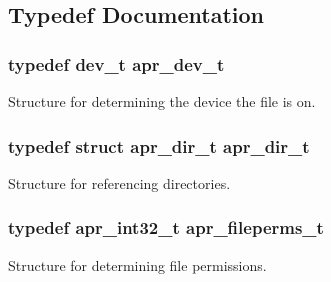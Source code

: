 \subsection{Typedef Documentation}
\hypertarget{group__apr__file__info_gae2c25c4b679613081599f776efa96c4a}{
\subsubsection[{apr\-\_\-dev\-\_\-t}]{\setlength{\rightskip}{0pt plus 5cm}typedef dev\-\_\-t {\bf apr\-\_\-dev\-\_\-t}}}\label{group__apr__file__info_gae2c25c4b679613081599f776efa96c4a}
Structure for determining the device the file is on. \hypertarget{group__apr__file__info_ga92ed8cf52cba2abb42cf74087aa74da8}{
\subsubsection[{apr\-\_\-dir\-\_\-t}]{\setlength{\rightskip}{0pt plus 5cm}typedef struct {\bf apr\-\_\-dir\-\_\-t} {\bf apr\-\_\-dir\-\_\-t}}}\label{group__apr__file__info_ga92ed8cf52cba2abb42cf74087aa74da8}
Structure for referencing directories. \hypertarget{group__apr__file__info_ga3af19c4c47007169064a70f9351bc7d8}{
\subsubsection[{apr\-\_\-fileperms\-\_\-t}]{\setlength{\rightskip}{0pt plus 5cm}typedef apr\-\_\-int32\-\_\-t {\bf apr\-\_\-fileperms\-\_\-t}}}\label{group__apr__file__info_ga3af19c4c47007169064a70f9351bc7d8}
Structure for determining file permissions. 

